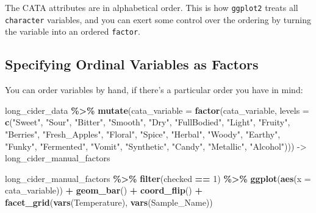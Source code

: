 \documentclass[
]{book}
\newenvironment{Shaded}{\begin{snugshade}}{\end{snugshade}}
\newcommand{\AttributeTok}[1]{\textcolor[rgb]{0.13,0.29,0.53}{#1}}
\newcommand{\DecValTok}[1]{\textcolor[rgb]{0.00,0.00,0.81}{#1}}
\newcommand{\FunctionTok}[1]{\textcolor[rgb]{0.13,0.29,0.53}{\textbf{#1}}}
\newcommand{\NormalTok}[1]{#1}
\newcommand{\OtherTok}[1]{\textcolor[rgb]{0.56,0.35,0.01}{#1}}
\newcommand{\SpecialCharTok}[1]{\textcolor[rgb]{0.81,0.36,0.00}{\textbf{#1}}}
\newcommand{\StringTok}[1]{\textcolor[rgb]{0.31,0.60,0.02}{#1}}
\begin{document}
The CATA attributes are in alphabetical order. This is how \texttt{ggplot2} treats all \texttt{character} variables, and you can exert some control over the ordering by turning the variable into an ordered \texttt{factor}.

\hypertarget{specifying-ordinal-variables-as-factors}{%
\subsection{Specifying Ordinal Variables as Factors}\label{specifying-ordinal-variables-as-factors}}

You can order variables by hand, if there's a particular order you have in mind:

\begin{Shaded}
\begin{Highlighting}[]
\NormalTok{long\_cider\_data }\SpecialCharTok{\%\textgreater{}\%}
  \FunctionTok{mutate}\NormalTok{(}\AttributeTok{cata\_variable =} \FunctionTok{factor}\NormalTok{(cata\_variable,}
                                \AttributeTok{levels =} \FunctionTok{c}\NormalTok{(}\StringTok{"Sweet"}\NormalTok{, }\StringTok{"Sour"}\NormalTok{, }\StringTok{"Bitter"}\NormalTok{,}
                                           \StringTok{"Smooth"}\NormalTok{, }\StringTok{"Dry"}\NormalTok{, }\StringTok{"FullBodied"}\NormalTok{,}
                                           \StringTok{"Light"}\NormalTok{,}
                                           \StringTok{"Fruity"}\NormalTok{, }\StringTok{"Berries"}\NormalTok{, }\StringTok{"Fresh\_Apples"}\NormalTok{,}
                                           \StringTok{"Floral"}\NormalTok{, }\StringTok{"Spice"}\NormalTok{,}
                                           \StringTok{"Herbal"}\NormalTok{, }\StringTok{"Woody"}\NormalTok{, }\StringTok{"Earthy"}\NormalTok{,}
                                           \StringTok{"Funky"}\NormalTok{, }\StringTok{"Fermented"}\NormalTok{, }\StringTok{"Vomit"}\NormalTok{,}
                                           \StringTok{"Synthetic"}\NormalTok{, }\StringTok{"Candy"}\NormalTok{,}
                                           \StringTok{"Metallic"}\NormalTok{, }\StringTok{"Alcohol"}\NormalTok{))) }\OtherTok{{-}\textgreater{}}\NormalTok{ long\_cider\_manual\_factors}

\NormalTok{long\_cider\_manual\_factors }\SpecialCharTok{\%\textgreater{}\%}
  \FunctionTok{filter}\NormalTok{(checked }\SpecialCharTok{==} \DecValTok{1}\NormalTok{) }\SpecialCharTok{\%\textgreater{}\%}
  \FunctionTok{ggplot}\NormalTok{(}\FunctionTok{aes}\NormalTok{(}\AttributeTok{x =}\NormalTok{ cata\_variable)) }\SpecialCharTok{+}
  \FunctionTok{geom\_bar}\NormalTok{() }\SpecialCharTok{+}
  \FunctionTok{coord\_flip}\NormalTok{() }\SpecialCharTok{+}
  \FunctionTok{facet\_grid}\NormalTok{(}\FunctionTok{vars}\NormalTok{(Temperature), }\FunctionTok{vars}\NormalTok{(Sample\_Name))}
\end{Highlighting}
\end{Shaded}
\end{document}
